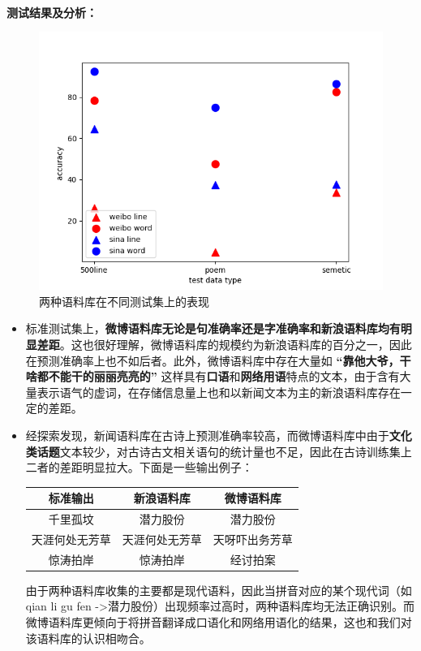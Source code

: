 \documentclass{article}
\begin{document}
\begin{spacing}{1.1}
\ \\\textbf{测试结果及分析：}
\begin{figure}[h]
	\centering
	\includegraphics[width=0.8\linewidth]{pic/accuracy05.png}
	\caption{两种语料库在不同测试集上的表现}
\end{figure}
\begin{itemize}
	\item 标准测试集上，\textbf{微博语料库无论是句准确率还是字准确率和新浪语料库均有明显差距}。这也很好理解，微博语料库的规模约为新浪语料库的百分之一，因此在预测准确率上也不如后者。此外，微博语料库中存在大量如 \textbf{“靠他大爷，干啥都不能干的丽丽亮亮的”} 这样具有\textbf{口语}和\textbf{网络用语}特点的文本，由于含有大量表示语气的虚词，在存储信息量上也和以新闻文本为主的新浪语料库存在一定的差距。
	\item 经探索发现，新闻语料库在古诗上预测准确率较高，而微博语料库中由于\textbf{文化类话题}文本较少，对古诗古文相关语句的统计量也不足，因此在古诗训练集上二者的差距明显拉大。下面是一些输出例子：
	\begin {center}
	\begin{tabular}{|c|c|c|}
		\textbf{标准输出} & \textbf{新浪语料库} & \textbf{微博语料库} \\
		\hline
		千里孤坟 & 潜力股份 & 潜力股份 \\
		\hline
		天涯何处无芳草  & 天涯何处无芳草 & 天呀吓出务芳草\\
		\hline
		惊涛拍岸 & 惊涛拍岸 & 经讨拍案 \\
	\end{tabular}
\end{center}
	由于两种语料库收集的主要都是现代语料，因此当拼音对应的某个现代词（如qian li gu fen ->潜力股份）出现频率过高时，两种语料库均无法正确识别。而微博语料库更倾向于将拼音翻译成口语化和网络用语化的结果，这也和我们对该语料库的认识相吻合。

\end{itemize}
\end{spacing}
\end{document}
